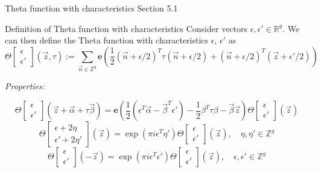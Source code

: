 \documentclass[11pt,aspectratio=169]{beamer}
\newcommand{\ee}[0]{\mathbf{e}}
\begin{document}
\begin{frame}{Theta function with characteristics}{\tiny \cite{Ber06} Section 5.1}
    \begin{block}{Definition of Theta function with characteristics}
        Consider vectors $ \epsilon ,  \epsilon' \in \mathbb R^g$.
        We can then define the Theta function with characteristics $ \epsilon$, $ \epsilon'$ as
        \[\Theta\begin{bmatrix}\epsilon \\ \epsilon'\end{bmatrix}(\vec z, \tau) := \sum_{\vec n \in \mathbb Z^g} \ee 
        \left( \frac{1}{2} (\vec n+\epsilon/2)^T \tau (\vec n+\epsilon/2) + (\vec n+\epsilon/2)^T (\vec z+\epsilon'/2) \right)\]
    \end{block}

    \emph{Properties:}

    \[\Theta\begin{bmatrix}\epsilon \\ \epsilon'\end{bmatrix}(\vec z + \vec \alpha + \tau \vec \beta) =
    \ee\left(\frac{1}{2}(\epsilon^T \vec \alpha - \vec \beta^T \epsilon') - \frac{1}{2} \beta^T \tau \beta - \vec \beta \vec z\right)
    \Theta\begin{bmatrix}\epsilon \\ \epsilon'\end{bmatrix}(\vec z)\]
    \[\Theta\begin{bmatrix}\epsilon + 2\eta \\ \epsilon' + 2\eta' \end{bmatrix}(\vec z) = \exp(\pi i \epsilon^T \eta')
    \Theta\begin{bmatrix}\epsilon \\ \epsilon'\end{bmatrix}(\vec z) , \quad \eta,\eta' \in \mathbb Z^g\]
    \[\Theta\begin{bmatrix}\epsilon \\ \epsilon'\end{bmatrix}(-\vec z) = \exp(\pi i \epsilon^T \epsilon') \Theta\begin{bmatrix}\epsilon \\ \epsilon'\end{bmatrix}(\vec z) , \quad \epsilon,\epsilon' \in \mathbb Z^g\]
\end{frame}
\end{document}
